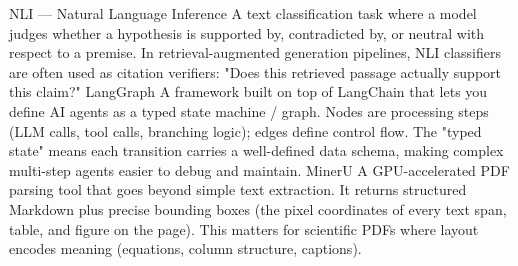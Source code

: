 \documentclass[aspectratio=169, 11pt]{beamer}
\begin{document}
{NLI — Natural Language Inference
A text classification task where a model judges whether a hypothesis is supported by, contradicted by, or neutral with respect to a premise. In retrieval-augmented generation pipelines, NLI classifiers are often used as citation verifiers: "Does this retrieved passage actually support this claim?"
LangGraph
A framework built on top of LangChain that lets you define AI agents as a typed state machine / graph. Nodes are processing steps (LLM calls, tool calls, branching logic); edges define control flow. The "typed state" means each transition carries a well-defined data schema, making complex multi-step agents easier to debug and maintain.
MinerU
A GPU-accelerated PDF parsing tool that goes beyond simple text extraction. It returns structured Markdown plus precise bounding boxes (the pixel coordinates of every text span, table, and figure on the page). This matters for scientific PDFs where layout encodes meaning (equations, column structure, captions).}







\end{document}
